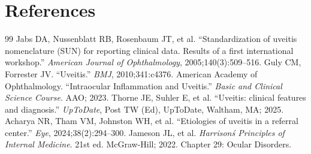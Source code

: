 \section*{References}
\begin{thebibliography}{99}
 Jabs DA, Nussenblatt RB, Rosenbaum JT, et al. ``Standardization of uveitis nomenclature (SUN) for reporting clinical data. Results of a first international workshop.'' \textit{American Journal of Ophthalmology}, 2005;140(3):509--516.
 Guly CM, Forrester JV. ``Uveitis.'' \textit{BMJ}, 2010;341:c4376.
 American Academy of Ophthalmology. ``Intraocular Inflammation and Uveitis.'' \textit{Basic and Clinical Science Course}. AAO; 2023.
 Thorne JE, Suhler E, et al. ``Uveitis: clinical features and diagnosis.'' \textit{UpToDate}, Post TW (Ed), UpToDate, Waltham, MA; 2025.
 Acharya NR, Tham VM, Johnston WH, et al. ``Etiologies of uveitis in a referral center.'' \textit{Eye}, 2024;38(2):294--300.
 Jameson JL, et al. \textit{Harrison\'s Principles of Internal Medicine}. 21st ed. McGraw-Hill; 2022. Chapter 29: Ocular Disorders.
\end{thebibliography}
